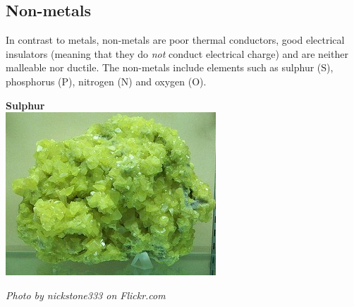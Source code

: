             \subsection*{Non-metals}
            \nopagebreak
\begin{minipage}{.5\textwidth}
        \label{m38708*id66021}In contrast to metals, non-metals are poor thermal conductors, good electrical insulators (meaning that they do \textsl{not} conduct electrical charge) and are neither malleable nor ductile. The non-metals include elements such as sulphur ($\text{S}$), phosphorus ($\text{P}$), nitrogen ($\text{N}$) and oxygen ($\text{O}$).\par 
\end{minipage}
\begin{minipage}{.5\textwidth}
\begin{center}
\textbf{Sulphur}\\
 \includegraphics[width=.4\textwidth]{photos/sulphurby-nickstone333.jpg}\par
\textit{Photo by nickstone333 on Flickr.com}
\end{center}
\end{minipage}
      \label{m38708*uid94}

